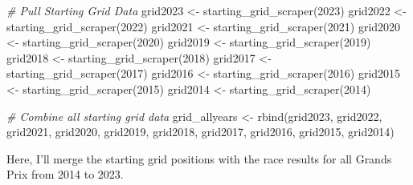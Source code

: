 \documentclass[
]{book}
\newenvironment{Shaded}{\begin{snugshade}}{\end{snugshade}}
\newcommand{\CommentTok}[1]{\textcolor[rgb]{0.56,0.35,0.01}{\textit{#1}}}
\newcommand{\DecValTok}[1]{\textcolor[rgb]{0.00,0.00,0.81}{#1}}
\newcommand{\FunctionTok}[1]{\textcolor[rgb]{0.00,0.00,0.00}{#1}}
\newcommand{\NormalTok}[1]{#1}
\newcommand{\OtherTok}[1]{\textcolor[rgb]{0.56,0.35,0.01}{#1}}
\begin{document}
\begin{Shaded}
\begin{Highlighting}[]
\CommentTok{\# Pull Starting Grid Data}
\NormalTok{grid2023 }\OtherTok{\textless{}{-}} \FunctionTok{starting\_grid\_scraper}\NormalTok{(}\DecValTok{2023}\NormalTok{)}
\NormalTok{grid2022 }\OtherTok{\textless{}{-}} \FunctionTok{starting\_grid\_scraper}\NormalTok{(}\DecValTok{2022}\NormalTok{)}
\NormalTok{grid2021 }\OtherTok{\textless{}{-}} \FunctionTok{starting\_grid\_scraper}\NormalTok{(}\DecValTok{2021}\NormalTok{)}
\NormalTok{grid2020 }\OtherTok{\textless{}{-}} \FunctionTok{starting\_grid\_scraper}\NormalTok{(}\DecValTok{2020}\NormalTok{)}
\NormalTok{grid2019 }\OtherTok{\textless{}{-}} \FunctionTok{starting\_grid\_scraper}\NormalTok{(}\DecValTok{2019}\NormalTok{)}
\NormalTok{grid2018 }\OtherTok{\textless{}{-}} \FunctionTok{starting\_grid\_scraper}\NormalTok{(}\DecValTok{2018}\NormalTok{)}
\NormalTok{grid2017 }\OtherTok{\textless{}{-}} \FunctionTok{starting\_grid\_scraper}\NormalTok{(}\DecValTok{2017}\NormalTok{)}
\NormalTok{grid2016 }\OtherTok{\textless{}{-}} \FunctionTok{starting\_grid\_scraper}\NormalTok{(}\DecValTok{2016}\NormalTok{)}
\NormalTok{grid2015 }\OtherTok{\textless{}{-}} \FunctionTok{starting\_grid\_scraper}\NormalTok{(}\DecValTok{2015}\NormalTok{)}
\NormalTok{grid2014 }\OtherTok{\textless{}{-}} \FunctionTok{starting\_grid\_scraper}\NormalTok{(}\DecValTok{2014}\NormalTok{)}

\CommentTok{\# Combine all starting grid data}
\NormalTok{grid\_allyears }\OtherTok{\textless{}{-}} \FunctionTok{rbind}\NormalTok{(grid2023,}
\NormalTok{                             grid2022,}
\NormalTok{                             grid2021, }
\NormalTok{                             grid2020,}
\NormalTok{                             grid2019,}
\NormalTok{                             grid2018,}
\NormalTok{                             grid2017,}
\NormalTok{                             grid2016,}
\NormalTok{                             grid2015,}
\NormalTok{                             grid2014)}
\end{Highlighting}
\end{Shaded}

Here, I'll merge the starting grid positions with the race results for all Grands Prix from 2014 to 2023.
\end{document}
